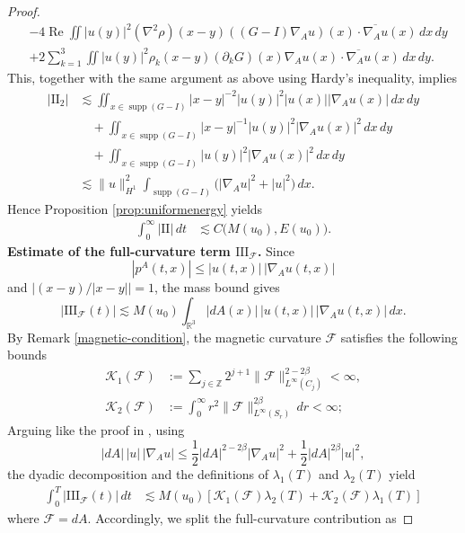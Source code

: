 \documentclass[10pt%
]{amsart}
\numberwithin{equation}{section}
\newcommand{\pa}{\partial}
\newcommand{\R}{\mathbb{R}}
\newcommand{\Z}{\mathbb{Z}}
\theoremstyle{definition}
\def\supp{\mathop{\mathrm{supp}}\nolimits}
\newcommand{\Fcurv}{\mathcal{F}}
\begin{document}
\begin{proof}
\begin{align*}
		&-4\mathop{\mathrm{Re}} \iint |u(y)|^2(\nabla^2\rho)(x-y) ((G-I)\nabla_A u)(x)\cdot \overline{\nabla_Au}(x)\,dx\,dy\\
		&+2\sum_{k=1}^3\iint|u(y)|^2 \rho_k(x-y)(\pa_kG)(x)\nabla_Au(x)\cdot \overline{\nabla_Au}(x)\,dx\,dy.
	\end{align*}
	This, together with the same argument as above using Hardy's inequality, implies
	\begin{align*}
		|\textrm{II}_2|
		&\lesssim \iint_{x\in \supp (G-I)} |x-y|^{-2}|u(y)|^2|u(x)||\nabla_Au(x)|\,dx\,dy\\
		&\quad+\iint_{x\in \supp (G-I)}|x-y|^{-1}|u(y)|^2|\nabla_Au(x)|^2\,dx\,dy\\
		&\quad +\iint_{x\in \supp(G-I)}|u(y)|^2|\nabla_Au(x)|^2\,dx\,dy\\
		&\lesssim \|u\|_{H^1}^2\int_{\mathop{\mathrm{supp}} (G-I)}\big(|\nabla_A u|^2+|u|^2\big)\,dx.
	\end{align*}
	Hence Proposition \ref{prop:uniformenergy} yields
	\begin{align*}
		\int_0^{\infty}|\textrm{II}|\,dt&\lesssim C\big(M(u_0),E(u_0)\big).
	\end{align*}
	\textbf{Estimate of the full-curvature term $\mathrm{III}_{\Fcurv}$.}
	Since
	\[
	|p^A(t,x)|\le |u(t,x)|\,|\nabla_Au(t,x)|
	\]
	and $|(x-y)/|x-y||=1$, the mass bound gives
	\begin{equation}\label{equ:III-basic}
	|\mathrm{III}_{\Fcurv}(t)|
	\lesssim M(u_0)\int_{\R^3}|dA(x)|\,|u(t,x)|\,|\nabla_Au(t,x)|\,dx.
	\end{equation}
By Remark \ref{magnetic-condition}, the magnetic curvature $\Fcurv$ satisfies the following bounds
\begin{align*}
				\mathcal K_1(\Fcurv)&:=\sum_{j\in\Z}2^{j+1}\|\Fcurv\|_{L^\infty(C_j)}^{2-2\beta}<\infty,\\
				\mathcal K_2(\Fcurv)&:=\int_0^\infty r^2\|\Fcurv\|_{L^\infty(S_r)}^{2\beta}\,dr<\infty;
			\end{align*}
Arguing like the proof in \cite{CCL},  using
	\[
	|dA|\,|u|\,|\nabla_Au|
	\le\frac12|dA|^{2-2\beta}|\nabla_Au|^2
	+\frac12|dA|^{2\beta}|u|^2,
	\]
	the dyadic decomposition and the definitions of $\lambda_1(T)$ and $\lambda_2(T)$ yield
	\begin{align}
	\int_0^T\!|\mathrm{III}_{\Fcurv}(t)|\,dt
	&\lesssim M(u_0)\left[
	\mathcal K_1(\Fcurv)\lambda_2(T)
	+\mathcal K_2(\Fcurv)\lambda_1(T)\right]\label{equ:III-K}
	\end{align}
where $\mathcal{F}=dA$.
Accordingly, we split the full-curvature contribution as

\end{proof}
\end{document}
